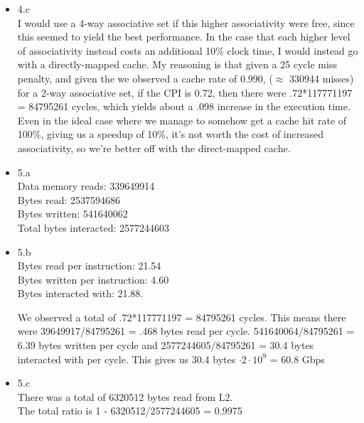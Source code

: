\documentclass[a4paper]{article}
\begin{document}
\begin{itemize}
\item{4.c} \\
I would use a 4-way associative set if this higher associativity were free, since this seemed to yield the best performance. In the case that each higher level of associativity instead costs an additional 10\% clock time, I would instead go with a directly-mapped cache. My reasoning is that given a 25 cycle miss penalty, and given the we observed a cache rate of 0.990, ($\approx$ 330944 misses) for a 2-way associative set, if the CPI is 0.72, then there were .72*117771197 = 84795261 cycles, which yields about a .098 increase in the execution time. Even in the ideal case where we manage to somehow get a cache hit rate of 100\%, giving us a speedup of 10\%, it's not worth the cost of increased associativity, so we're better off with the direct-mapped cache. \\

\item{5.a} \\
Data memory reads: 339649914 \\
Bytes read: 2537594686 \\
Bytes written: 541640062 \\
Total bytes interacted: 2577244603 \\

\item{5.b} \\
Bytes read per instruction: 21.54 \\
Bytes written per instruction: 4.60 \\
Bytes interacted with: 21.88.

We observed a total of .72*117771197 = 84795261 cycles. This means there were 39649917/84795261 = .468 bytes read per cycle. 541640064/84795261 = 6.39 bytes written per cycle and 2577244605/84795261 = 30.4 bytes interacted with per cycle.
This gives us 30.4 bytes $\cdot 2 \cdot 10^9$ = 60.8 Gbps \\

\item{5.c} \\
There was a total of 6320512 bytes read from L2. \\

The total ratio is 1 - 6320512/2577244605 = 0.9975 \\


\end{itemize}
\end{document}

